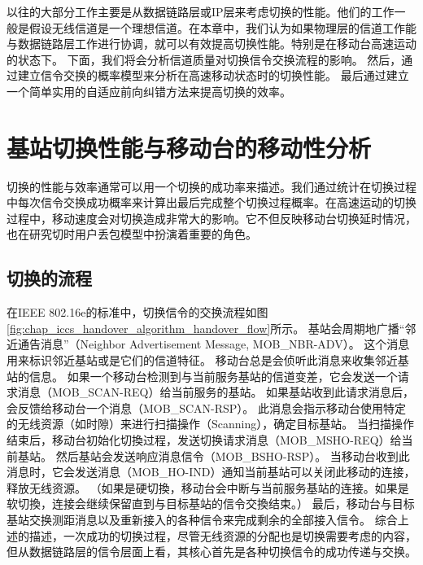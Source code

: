 以往的大部分工作主要是从数据链路层或IP层来考虑切换的性能。他们的工作一般是假设无线信道是一个理想信道。在本章中，我们认为如果物理层的信道工作能与数据链路层工作进行协调，就可以有效提高切换性能。特别是在移动台高速运动的状态下。
下面，我们将会分析信道质量对切换信令交换流程的影响。
然后，通过建立信令交换的概率模型来分析在高速移动状态时的切换性能。
最后通过建立一个简单实用的自适应前向纠错方法来提高切换的效率。


\section{基站切换性能与移动台的移动性分析}
\label{section_iccs_handover_algorithm_mobility_analysis}
切换的性能与效率通常可以用一个切换的成功率来描述。我们通过统计在切换过程中每次信令交换成功概率来计算出最后完成整个切换过程概率。在高速运动的切换过程中，移动速度会对切换造成非常大的影响。它不但反映移动台切换延时情况，也在研究切时用户丢包模型中扮演着重要的角色。
\subsection{切换的流程}
\label{subsection_iccs_handover_algorithm_mobility_analysis_handover_flow}
在IEEE 802.16e的标准中，切换信令的交换流程如图\ref{fig:chap_iccs_handover_algorithm_handover_flow}所示。
基站会周期地广播“邻近通告消息”（Neighbor Advertisement Message, MOB\_NBR-ADV）。
这个消息用来标识邻近基站或是它们的信道特征。
移动台总是会侦听此消息来收集邻近基站的信息。
如果一个移动台检测到与当前服务基站的信道变差，它会发送一个请求消息（MOB\_SCAN-REQ）给当前服务的基站。
如果基站收到此请求消息后，会反馈给移动台一个消息（MOB\_SCAN-RSP）。
此消息会指示移动台使用特定的无线资源（如时隙）来进行扫描操作（Scanning），确定目标基站。
当扫描操作结束后，移动台初始化切換过程，发送切换请求消息（MOB\_MSHO-REQ）给当前基站。
然后基站会发送响应消息信令（MOB\_BSHO-RSP）。
当移动台收到此消息时，它会发送消息（MOB\_HO-IND）通知当前基站可以关闭此移动的连接，释放无线资源。
（如果是硬切換，移动台会中断与当前服务基站的连接。如果是软切換，连接会继续保留直到与目标基站的信令交換结束。）
最后，移动台与目标基站交换测距消息以及重新接入的各种信令来完成剩余的全部接入信令。
综合上述的描述，一次成功的切换过程，尽管无线资源的分配也是切换需要考虑的内容，
但从数据链路层的信令层面上看，其核心首先是各种切换信令的成功传递与交换。

